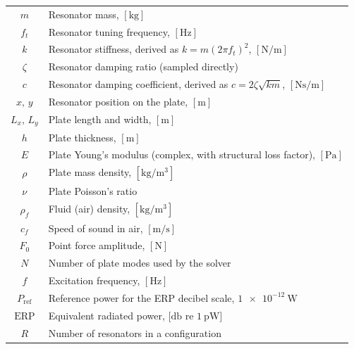 \begin{tabular}{cp{}}
  $m$        & Resonator mass, $[\si{\kilo\gram}]$ \\
  $f_t$      & Resonator tuning frequency, $[\si{\hertz}]$ \\
  $k$        & Resonator stiffness, derived as $k = m(2\pi f_t)^2$, $[\si{\newton\per\meter}]$ \\
  $\zeta$    & Resonator damping ratio (sampled directly) \\
  $c$        & Resonator damping coefficient, derived as $c = 2\zeta\sqrt{km}$, $[\si{\newton\second\per\meter}]$ \\
  $x,\,y$    & Resonator position on the plate, $[\si{\meter}]$ \\
  $L_x,\,L_y$& Plate length and width, $[\si{\meter}]$ \\
  $h$        & Plate thickness, $[\si{\meter}]$ \\
  $E$        & Plate Young's modulus (complex, with structural loss factor), $[\si{\pascal}]$ \\
  $\rho$     & Plate mass density, $[\si{\kilo\gram\per\cubic\meter}]$ \\
  $\nu$      & Plate Poisson's ratio \\
  $\rho_f$   & Fluid (air) density, $[\si{\kilo\gram\per\cubic\meter}]$ \\
  $c_f$      & Speed of sound in air, $[\si{\meter\per\second}]$ \\
  $F_0$      & Point force amplitude, $[\si{\newton}]$ \\
  $N$        & Number of plate modes used by the solver \\
  $f$        & Excitation frequency, $[\si{\hertz}]$ \\
  $P_\text{ref}$ & Reference power for the ERP decibel scale, $\SI{1e-12}{\watt}$ \\
  $\text{ERP}$   & Equivalent radiated power, $[\si{\decibel}$ re $\SI{1}{\pico\watt}]$ \\
  $R$        & Number of resonators in a configuration \\
\end{tabular}\\
